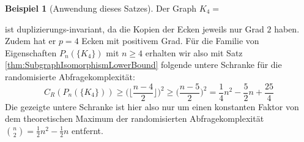\documentclass[10pt,a4paper]{scrreprt}
\theoremstyle{definition}
\newtheorem{examplex}{Beispiel}
\newenvironment{example}[1]
{ \begin{leftbar} \begin{examplex}#1}
{ \end{examplex} \ignorespacesafterend \end{leftbar} }
\begin{document}
\begin{example}[Anwendung dieses Satzes]
Der Graph $K_4 =$
 ist duplizierungs-invariant, da die Kopien
der Ecken jeweils nur Grad $2$ haben. Zudem
hat er $p=4$ Ecken mit positivem Grad. Für die Familie von
Eigenschaften $P_n(\{K_4\})$ mit $ n\geq 4$ erhalten wir also
mit Satz \ref{thm:SubgraphIsomorphismLowerBound} folgende
untere Schranke für die randomisierte Abfragekomplexität:
$$ C_R(P_n(\{K_4\})) \geq 
\Big ( \Big \lfloor  \frac{n-4}{2} \Big \rfloor \Big ) ^2 \geq
\Big ( \frac{n-5}{2} \Big ) ^2 = 
\frac{1}{4} n^2 - \frac{5}{2} n + \frac{25}{4} 
$$
Die gezeigte untere Schranke ist hier also nur um einen
konstanten Faktor von dem theoretischen Maximum
der randomisierten Abfragekomplexität
$\binom{n}{2} = \frac{1}{2}n^2 - \frac{1}{2}n$
entfernt.
\end{example}
\end{document}

